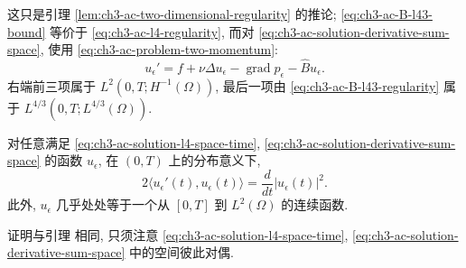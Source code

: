 \begin{Proof}
这只是引理 \ref{lem:ch3-ac-two-dimensional-regularity} 的推论; \eqref{eq:ch3-ac-B-l43-bound} 等价于 \eqref{eq:ch3-ac-l4-regularity}, 而对 \eqref{eq:ch3-ac-solution-derivative-sum-space}, 使用 \eqref{eq:ch3-ac-problem-two-momentum}:
\[
u_\epsilon'=f+\nu\Delta u_\epsilon
-\operatorname{grad}p_\epsilon-\widehat B u_\epsilon.
\]
右端前三项属于 $L^2(0,T;H^{-1}(\Omega))$, 最后一项由 \eqref{eq:ch3-ac-B-l43-regularity} 属于 $L^{4/3}(0,T;L^{4/3}(\Omega))$.
\end{Proof}

\begin{Lemma}
\label{lem:ch3-ac-energy-chain-rule}
对任意满足 \eqref{eq:ch3-ac-solution-l4-space-time}, \eqref{eq:ch3-ac-solution-derivative-sum-space} 的函数 $u_\epsilon$, 在 $(0,T)$ 上的分布意义下,
\begin{equation}
2\langle u_\epsilon'(t),u_\epsilon(t)\rangle
=\frac d{dt}|u_\epsilon(t)|^2.
\label{eq:ch3-ac-energy-chain-rule}
\end{equation}
此外, $u_\epsilon$ 几乎处处等于一个从 $[0,T]$ 到 $L^2(\Omega)$ 的连续函数.
\end{Lemma}

\begin{Proof}
证明与引理  相同, 只须注意 \eqref{eq:ch3-ac-solution-l4-space-time}, \eqref{eq:ch3-ac-solution-derivative-sum-space} 中的空间彼此对偶.
\end{Proof}

